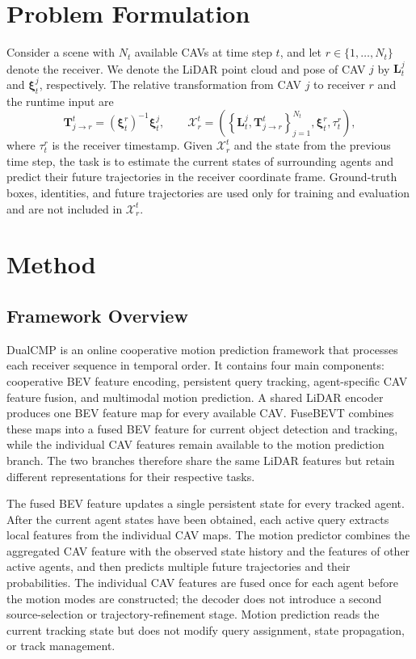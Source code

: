 \documentclass[lettersize,journal]{IEEEtran}
\begin{document}
\section{Problem Formulation}

Consider a scene with \(N_t\) available CAVs at time step \(t\), and let \(r\in\{1,\ldots,N_t\}\) denote the receiver. We denote the LiDAR point cloud and pose of CAV \(j\) by \(\mathbf{L}_t^j\) and \(\boldsymbol{\xi}_t^j\), respectively. The relative transformation from CAV \(j\) to receiver \(r\) and the runtime input are
\[
\mathbf{T}_{j\rightarrow r}^t
=\left(\boldsymbol{\xi}_t^r\right)^{-1}\boldsymbol{\xi}_t^j,
\qquad
\mathcal{X}_r^t=
\left(
\left\{\mathbf{L}_t^j,\mathbf{T}_{j\rightarrow r}^t\right\}_{j=1}^{N_t},
\boldsymbol{\xi}_t^r,\tau_t^r
\right),
\tag{1}
\]
where \(\tau_t^r\) is the receiver timestamp. Given \(\mathcal{X}_r^t\) and the state from the previous time step, the task is to estimate the current states of surrounding agents and predict their future trajectories in the receiver coordinate frame. Ground-truth boxes, identities, and future trajectories are used only for training and evaluation and are not included in \(\mathcal{X}_r^t\).

\section{Method}
\subsection{Framework Overview}

DualCMP is an online cooperative motion prediction framework that processes each receiver sequence in temporal order. It contains four main components: cooperative BEV feature encoding, persistent query tracking, agent-specific CAV feature fusion, and multimodal motion prediction. A shared LiDAR encoder produces one BEV feature map for every available CAV. FuseBEVT combines these maps into a fused BEV feature for current object detection and tracking, while the individual CAV features remain available to the motion prediction branch. The two branches therefore share the same LiDAR features but retain different representations for their respective tasks.

The fused BEV feature updates a single persistent state for every tracked agent. After the current agent states have been obtained, each active query extracts local features from the individual CAV maps. The motion predictor combines the aggregated CAV feature with the observed state history and the features of other active agents, and then predicts multiple future trajectories and their probabilities. The individual CAV features are fused once for each agent before the motion modes are constructed; the decoder does not introduce a second source-selection or trajectory-refinement stage. Motion prediction reads the current tracking state but does not modify query assignment, state propagation, or track management.
\end{document}
